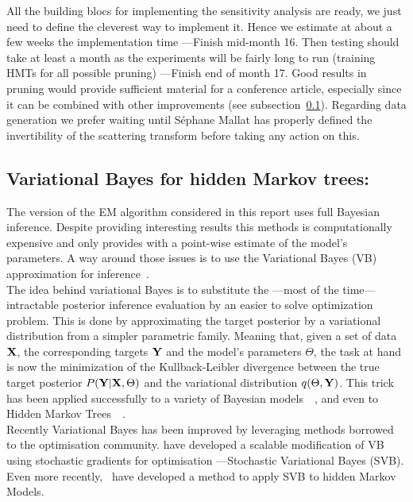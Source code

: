 \documentclass[a4paper,11pt]{report}
\begin{document}
			All the building blocs for implementing the sensitivity analysis are ready, we just need to define the cleverest way to implement it. Hence we estimate at about a few weeks the implementation time ---Finish mid-month 16. Then testing should take at least a month as the experiments will be fairly long to run (training HMTs for all possible pruning) ---Finish end of month 17. Good results in pruning would provide sufficient material for a conference article, especially since it can be combined with other improvements (see subsection~\ref{subsec:Ccl/FutW/VB}). Regarding data generation we prefer waiting until S\'ephane Mallat has properly defined the invertibility of the scattering transform before taking any action on this.
			
		\subsection{Variational Bayes for hidden Markov trees:}
			\label{subsec:Ccl/FutW/VB}

			The version of the EM algorithm considered in this report uses full Bayesian inference. Despite providing interesting results this methods is computationally expensive and only provides with a point-wise estimate of the model's parameters. A way around those issues is to use the Variational Bayes (VB) approximation for inference~\cite{wainwright2008graphical}.\\
			
			The idea behind variational Bayes is to substitute the ---most of the time--- intractable posterior inference evaluation by an easier to solve optimization problem. This is done by approximating the target posterior by a variational distribution from a simpler parametric family. Meaning that, given a set of data ${\bf X}$, the corresponding targets ${\bf Y}$ and the model's parameters $\Theta$, the task at hand is now the minimization of the Kullback-Leibler divergence between the true target posterior $P({\bf Y} | {\bf X}, \Theta)$ and the variational distribution $q(\Theta, {\bf Y})$. This trick has been applied successfully to a variety of Bayesian models~\citep{attias2000variational}~\citep{wainwright2008graphical}, and even to Hidden Markov Trees~\citep{dasgupta2006texture}~\citep{olariu2009modified}.\\

			Recently Variational Bayes has been improved by leveraging methods borrowed to the optimisation community. \citet{hoffman2013stochastic} have developed a scalable modification of VB using stochastic gradients for optimisation ---Stochastic Variational Bayes (SVB). Even more recently,~\citet{NIPS2014_5560} have developed a method to apply SVB to hidden Markov Models. \\
\end{document}
